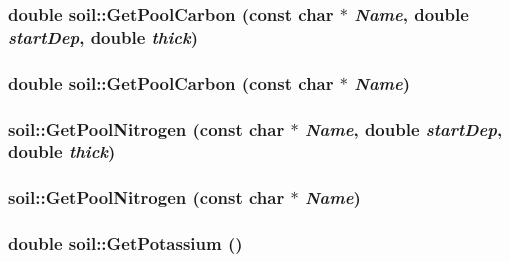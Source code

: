 \label{classsoil_a9c973ff43a4cc843eea1f8cac178766e}
\hypertarget{classsoil_a9e5128bdf857aedf7ab6dd2e12783873}{
\subsubsection[{GetPoolCarbon}]{\setlength{\rightskip}{0pt plus 5cm}double soil::GetPoolCarbon (const char $\ast$ {\em Name}, \/  double {\em startDep}, \/  double {\em thick})}}
\label{classsoil_a9e5128bdf857aedf7ab6dd2e12783873}
\hypertarget{classsoil_ad10beb6240ba008a5e97b86f084fbd7d}{
\subsubsection[{GetPoolCarbon}]{\setlength{\rightskip}{0pt plus 5cm}double soil::GetPoolCarbon (const char $\ast$ {\em Name})}}
\label{classsoil_ad10beb6240ba008a5e97b86f084fbd7d}
\hypertarget{classsoil_a3fecfad808499426b79dc29f2bfad3cb}{
\subsubsection[{GetPoolNitrogen}]{ soil::GetPoolNitrogen (const char $\ast$ {\em Name}, \/  double {\em startDep}, \/  double {\em thick})}}
\label{classsoil_a3fecfad808499426b79dc29f2bfad3cb}
\hypertarget{classsoil_a3ff1423ec9878c087c999958e2a91961}{
\subsubsection[{GetPoolNitrogen}]{ soil::GetPoolNitrogen (const char $\ast$ {\em Name})}}
\label{classsoil_a3ff1423ec9878c087c999958e2a91961}
\hypertarget{classsoil_ace8910daf41b497cdf1343ecbfde3e5b}{
\subsubsection[{GetPotassium}]{\setlength{\rightskip}{0pt plus 5cm}double soil::GetPotassium ()}}
